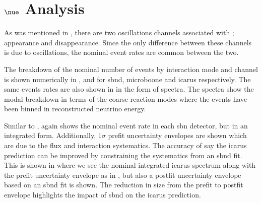 \newpage
\section{\texorpdfstring{$\nue$ Analysis}{nue Analysis}}\label{sec:nue_analysis}

As was mentioned in , there are two oscillations channels associated with \nue; \nue appearance and \nue disappearance. Since the only difference between these channels is due to oscillations, the nominal event rates are common between the two. 

The breakdown of the nominal number of events by interaction mode and channel is shown numerically in ,  and  for \gls{sbnd}, \gls{microboone} and \gls{icarus} respectively. The same events rates are also shown in  in the form of spectra. The spectra show the modal breakdown in terms of the coarse reaction modes where the events have been binned in reconstructed neutrino energy. 

Similar to ,  again shows the nominal event rate in each \gls{sbn} detector, but in an integrated form. Additionally, $1\sigma$ prefit uncertainty envelopes are shown which are due to the flux and interaction systematics. The accuracy of say the \gls{icarus} prediction can be improved by constraining the systematics from an \gls{sbnd} fit. This is shown in  where we see the nominal integrated \gls{icarus} spectrum along with the prefit uncertainty envelope as in , but also a postfit uncertainty envelope based on an \gls{sbnd} fit is shown. The reduction in size from the prefit to postfit envelope highlights the impact of \gls{sbnd} on the \gls{icarus} prediction. 

